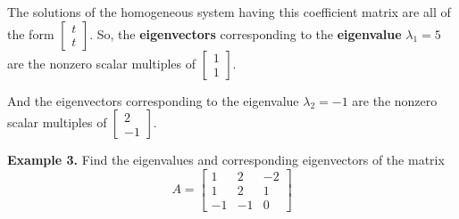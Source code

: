 \documentclass{article}
\newcommand\B{\textbf}
\begin{document}
    The solutions of the homogeneous system having this coefficient matrix are all of the form $ \begin{bmatrix}
        t \\ t
    \end{bmatrix}$.
    So, the \B{eigenvectors} corresponding to the \B{eigenvalue} $\lambda_1 = 5$ are the nonzero scalar multiples of 
    $ \begin{bmatrix}
        1 \\ 1
    \end{bmatrix}$.

    And the eigenvectors corresponding to the eigenvalue $\lambda_2 = -1$ are the nonzero scalar multiples of
    $ \begin{bmatrix}
        2 \\ -1
    \end{bmatrix}$.
    
    \B{Example 3.} Find the eigenvalues and corresponding eigenvectors of the matrix
    \[ A = \begin{bmatrix}
        1 & 2 & -2\\
        1 & 2 & 1\\
        -1 & -1 & 0
    \end{bmatrix}\]
\end{document}
